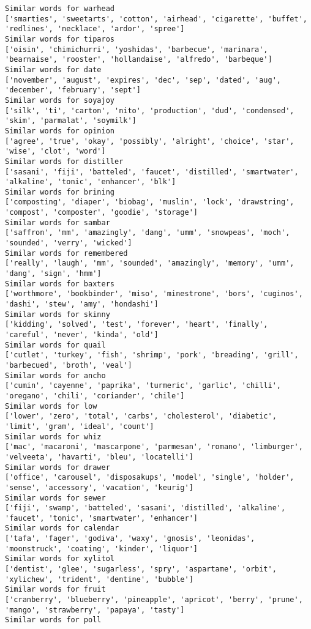 \documentclass[11pt]{article}
\begin{document}
\begin{Verbatim}[commandchars=\\\{\}]
Similar words for warhead
['smarties', 'sweetarts', 'cotton', 'airhead', 'cigarette', 'buffet', 'redlines', 'necklace', 'ardor', 'spree']
Similar words for tiparos
['oisin', 'chimichurri', 'yoshidas', 'barbecue', 'marinara', 'bearnaise', 'rooster', 'hollandaise', 'alfredo', 'barbeque']
Similar words for date
['november', 'august', 'expires', 'dec', 'sep', 'dated', 'aug', 'december', 'february', 'sept']
Similar words for soyajoy
['silk', 'ti', 'carton', 'nito', 'production', 'dud', 'condensed', 'skim', 'parmalat', 'soymilk']
Similar words for opinion
['agree', 'true', 'okay', 'possibly', 'alright', 'choice', 'star', 'wise', 'clot', 'word']
Similar words for distiller
['sasani', 'fiji', 'batteled', 'faucet', 'distilled', 'smartwater', 'alkaline', 'tonic', 'enhancer', 'blk']
Similar words for brining
['composting', 'diaper', 'biobag', 'muslin', 'lock', 'drawstring', 'compost', 'composter', 'goodie', 'storage']
Similar words for sambar
['saffron', 'mm', 'amazingly', 'dang', 'umm', 'snowpeas', 'moch', 'sounded', 'verry', 'wicked']
Similar words for remembered
['really', 'laugh', 'mm', 'sounded', 'amazingly', 'memory', 'umm', 'dang', 'sign', 'hmm']
Similar words for baxters
['worthmore', 'bookbinder', 'miso', 'minestrone', 'bors', 'cuginos', 'dashi', 'stew', 'amy', 'hondashi']
Similar words for skinny
['kidding', 'solved', 'test', 'forever', 'heart', 'finally', 'careful', 'never', 'kinda', 'old']
Similar words for quail
['cutlet', 'turkey', 'fish', 'shrimp', 'pork', 'breading', 'grill', 'barbecued', 'broth', 'veal']
Similar words for ancho
['cumin', 'cayenne', 'paprika', 'turmeric', 'garlic', 'chilli', 'oregano', 'chili', 'coriander', 'chile']
Similar words for low
['lower', 'zero', 'total', 'carbs', 'cholesterol', 'diabetic', 'limit', 'gram', 'ideal', 'count']
Similar words for whiz
['mac', 'macaroni', 'mascarpone', 'parmesan', 'romano', 'limburger', 'velveeta', 'havarti', 'bleu', 'locatelli']
Similar words for drawer
['office', 'carousel', 'disposakups', 'model', 'single', 'holder', 'sense', 'accessory', 'vacation', 'keurig']
Similar words for sewer
['fiji', 'swamp', 'batteled', 'sasani', 'distilled', 'alkaline', 'faucet', 'tonic', 'smartwater', 'enhancer']
Similar words for calendar
['tafa', 'fager', 'godiva', 'waxy', 'gnosis', 'leonidas', 'moonstruck', 'coating', 'kinder', 'liquor']
Similar words for xylitol
['dentist', 'glee', 'sugarless', 'spry', 'aspartame', 'orbit', 'xylichew', 'trident', 'dentine', 'bubble']
Similar words for fruit
['cranberry', 'blueberry', 'pineapple', 'apricot', 'berry', 'prune', 'mango', 'strawberry', 'papaya', 'tasty']
Similar words for poll

\end{Verbatim}
\end{document}
